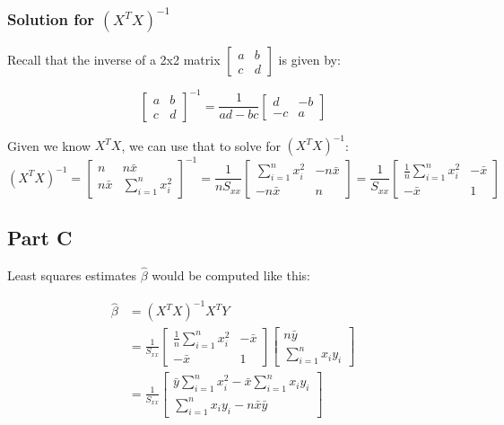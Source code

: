 \documentclass[
  letterpaper,
  DIV=11,
  numbers=noendperiod]{scrartcl}
\begin{document}
\hypertarget{solution-for-xtx-1}{%
\subsubsection{\texorpdfstring{Solution for
\((X^TX)^{-1}\)}{Solution for (X\^{}TX)\^{}\{-1\}}}\label{solution-for-xtx-1}}

Recall that the inverse of a 2x2 matrix
\(\begin{bmatrix} a & b \\ c & d \end{bmatrix}\) is given by:

\[ \begin{bmatrix} a & b \\ c & d \end{bmatrix}^{-1} = \frac{1}{ad - bc} \begin{bmatrix} d & -b \\ -c & a \end{bmatrix} \]

Given we know \(X^TX\), we can use that to solve for \((X^TX)^{-1}\):
\[ (X^TX)^{-1} = \begin{bmatrix} n & n\bar{x} \\ n\bar{x} & \sum_{i=1}^{n}x_i^2 \end{bmatrix}^{-1} = \frac{1}{nS_{xx}} \begin{bmatrix} \sum_{i=1}^{n}x_i^2 & -n\bar{x} \\ -n\bar{x} & n \end{bmatrix} = \frac{1}{S_{xx}} \begin{bmatrix} \frac{1}{n}\sum_{i=1}^{n}x_i^2 & -\bar{x} \\ -\bar{x} & 1 \end{bmatrix}\]

\newpage{}

\hypertarget{part-c}{%
\subsection{Part C}\label{part-c}}

Least squares estimates \(\hat{\beta}\) would be computed like this:

\[
\begin{align*}
\hat{\beta} &= (X^TX)^{-1}X^TY \\
&= \frac{1}{S_{xx}} \begin{bmatrix} \frac{1}{n}\sum_{i=1}^{n}x_i^2 & -\bar{x} \\ -\bar{x} & 1 \end{bmatrix} \begin{bmatrix} n\bar{y} \\ \sum_{i=1}^{n}x_iy_i \end{bmatrix} \\
&= \frac{1}{S_{xx}} \begin{bmatrix} \bar{y}\sum_{i=1}^nx_{i}^2 -\bar{x}\sum_{i=1}^nx_{i}y_i \\ \sum_{i=1}^nx_{i}y_i -n\bar{x}\bar{y} \end{bmatrix} 
\end{align*}
\]
\end{document}
